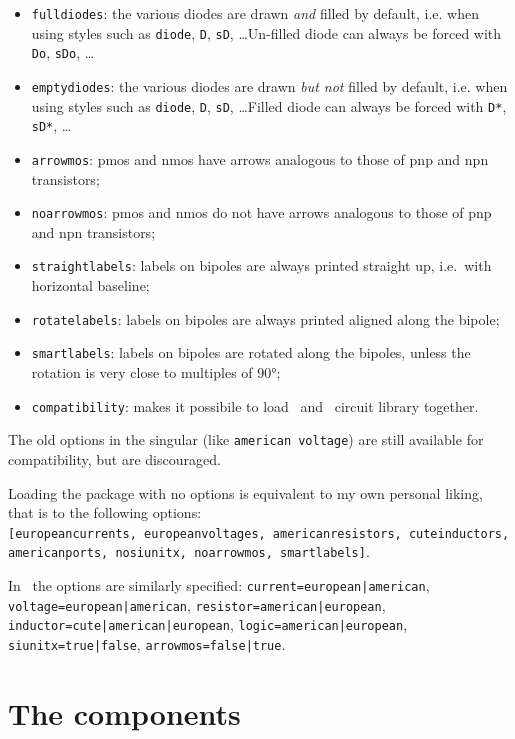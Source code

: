 \documentclass[a4paper]{article}
\begin{document}
\begin{itemize}
	\item \texttt{fulldiodes}: the various diodes are drawn \emph{and} filled by default, i.e. when using styles such as \texttt{diode}, \texttt{D}, \texttt{sD}, \ldots Un-filled diode can always be forced with \texttt{Do}, \texttt{sDo}, \ldots
	\item \texttt{emptydiodes}: the various diodes are drawn \emph{but not} filled by default, i.e. when using styles such as \texttt{diode}, \texttt{D}, \texttt{sD}, \ldots Filled diode can always be forced with \texttt{D*}, \texttt{sD*}, \ldots
	\item \texttt{arrowmos}: pmos and nmos have arrows analogous to those of pnp and npn transistors;
	\item \texttt{noarrowmos}: pmos and nmos do not have arrows analogous to those of pnp and npn transistors;
	\item \texttt{straightlabels}: labels on bipoles are always printed straight up, i.e.~with horizontal baseline;
	\item \texttt{rotatelabels}: labels on bipoles are always printed aligned along the bipole;
	\item \texttt{smartlabels}: labels on bipoles are rotated along the bipoles, unless the rotation is very close to multiples of 90°;
	\item \texttt{compatibility}: makes it possibile to load \Circuitikz\ and \TikZ\ circuit library together.
\end{itemize}	

The old options in the singular (like \texttt{american voltage}) are still available for compatibility, but are discouraged.

\medskip

Loading the package with no options is equivalent to my own personal liking, that is to the following options:\\
 \texttt{[europeancurrents, europeanvoltages, americanresistors, cuteinductors, americanports, nosiunitx, noarrowmos, smartlabels]}.
 
\medskip

In \ConTeXt\ the options are similarly specified: \texttt{current=european|american}, \texttt{voltage=european|american},  \texttt{resistor=american|european},  \texttt{inductor=cute|american|european}, \texttt{logic=american|european}, \texttt{siunitx=true|false}, \texttt{arrowmos=false|true}.
 
\section{The components}
\end{document}
